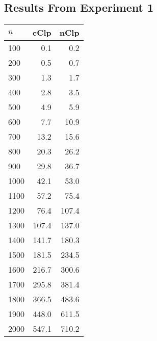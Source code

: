 \subsection{Results From Experiment 1}
\label{app:exp1}
\begin{tabular}{lrr}
     $n$ & cClp               & nClp \\ \hline
     100 &   0.1              &   0.2 \\
     200 &   0.5              &   0.7 \\
     300 &   1.3              &   1.7 \\
     400 &   2.8              &   3.5 \\
     500 &   4.9              &   5.9 \\
     600 &   7.7              &  10.9 \\
     700 &  13.2              &  15.6 \\
     800 &  20.3              &  26.2 \\
     900 &  29.8              &  36.7 \\
    1000 &  42.1              &  53.0 \\
    1100 &  57.2              &  75.4 \\
    1200 &  76.4              & 107.4 \\
    1300 & 107.4              & 137.0 \\
    1400 & 141.7              & 180.3 \\
    1500 & 181.5              & 234.5 \\
    1600 & 216.7              & 300.6 \\
    1700 & 295.8              & 381.4 \\
    1800 & 366.5              & 483.6 \\
    1900 & 448.0              & 611.5 \\
    2000 & 547.1              & 710.2
\end{tabular}

